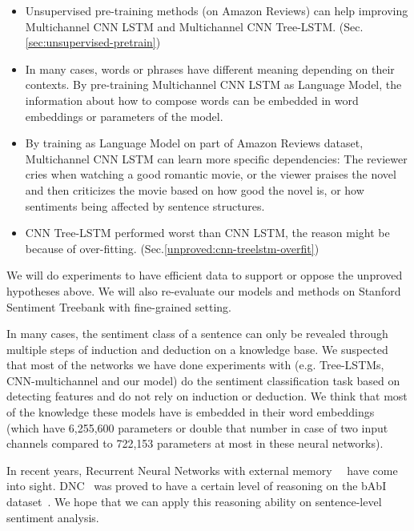 \begin{itemize}
\item Unsupervised pre-training methods (on Amazon Reviews) can help improving Multichannel CNN LSTM and Multichannel CNN Tree-LSTM. (Sec.\ref{sec:unsupervised-pretrain})

\item In many cases, words or phrases have different meaning depending on their contexts.
By pre-training Multichannel CNN LSTM as Language Model, the information about how to compose words can be embedded in word embeddings or parameters of the model.

\item By training as Language Model on part of Amazon Reviews dataset, Multichannel CNN LSTM can learn more specific dependencies: The reviewer cries when watching a good romantic movie, or the viewer praises the novel and then criticizes the movie based on how good the novel is, or how sentiments being affected by sentence structures. 

\item CNN Tree-LSTM performed worst than CNN LSTM, the reason might be because of over-fitting. (Sec.\ref{unproved:cnn-treelstm-overfit})
\end{itemize}

We will do experiments to have efficient data to support or oppose the unproved hypotheses above.
We will also re-evaluate our models and methods on Stanford Sentiment Treebank with fine-grained setting.

In many cases, the sentiment class of a sentence can only be revealed through multiple steps of induction and deduction on a knowledge base.
We suspected that most of the networks we have done experiments with (e.g. Tree-LSTMs, CNN-multichannel and our model) do the sentiment classification task based on detecting features and do not rely on induction or deduction.
We think that most of the knowledge these models have is embedded in their word embeddings (which have 6,255,600 parameters or double that number in case of two input channels compared to 722,153 parameters at most in these neural networks).

In recent years, Recurrent Neural Networks with external memory~\cite{Graves_Nature2016}~\cite{neural-turing-machine} have come into sight.
DNC~\cite{Graves_Nature2016} was proved to have a certain level of reasoning on the bAbI dataset~\cite{bAbi}.
We hope that we can apply this reasoning ability on sentence-level sentiment analysis.
